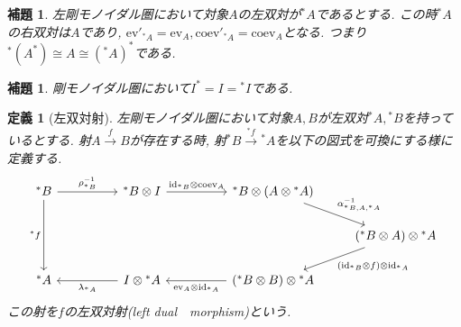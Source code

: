 \documentclass[a4paper,12pt]{ltjsarticle}
\theoremstyle{break}
\newtheorem{defn}[thm]{定義}
\newtheorem{lem}[thm]{補題}
\newcommand{\xr}[1]{\xrightarrow{#1}}
\newcommand{\id}{\mathrm{id}}
\newcommand{\eva}{\mathrm{ev}}
\newcommand{\coev}{\mathrm{coev}}
\newcommand{\al}{\alpha}
\newcommand{\la}{\lambda}
\newcommand{\ve}{\varepsilon}
\newcommand{\dav}{\dashv}
\newcommand{\ot}{\otimes}
\numberwithin{equation}{section}
\begin{document}
\begin{lem}
  左剛モノイダル圏において対象$A$の左双対が${}^*A$であるとする. 
  この時${}^*A$の右双対は$A$であり, $\eva'_{{}^*A}=\eva_A, \coev'_{{}^*A}=\coev_A$となる.
  つまり${}^*(A^*) \cong A \cong ({}^*A)^*$である.  
\end{lem}

\begin{lem}
  剛モノイダル圏において$I^*=I={}^*I$である. 
\end{lem}





\begin{defn}[左双対射]
  左剛モノイダル圏において対象$A,B$が左双対${}^*A,{}^*B$を持っているとする. 
  射$A \xr{f} B$が存在する時, 射${}^*B \xr{{}^*f} {}^*A$を以下の図式を可換にする様に定義する.
  \[\begin{tikzcd}
    {{}^*B} && {{}^*B \ot I} && {{}^*B \ot (A \ot {}^*A)} \\
    &&&&& {({}^*B \ot A) \ot {}^*A} \\
    {{}^*A} && {I \ot {}^*A} && {({}^*B \ot B) \ot {}^*A}
    \arrow["{\rho_{{}^*B}^{-1}}", from=1-1, to=1-3]
    \arrow["{\id_{{}^*B} \ot \coev_A}", from=1-3, to=1-5]
    \arrow["{\al_{{}^*B,A,{}^*A}^{-1}}", from=1-5, to=2-6]
    \arrow["{(\id_{{}^*B} \ot f) \ot \id_{{}^*A}}", from=2-6, to=3-5]
    \arrow["{\eva_A \ot \id_{{}^*A}}", from=3-5, to=3-3]
    \arrow["{\la_{{}^*A}}", from=3-3, to=3-1]
    \arrow["{{}^*f}"', from=1-1, to=3-1]
  \end{tikzcd}\]
  この射を$f$の左双対射(left dual　morphism)という. 
\end{defn}
\end{document}
